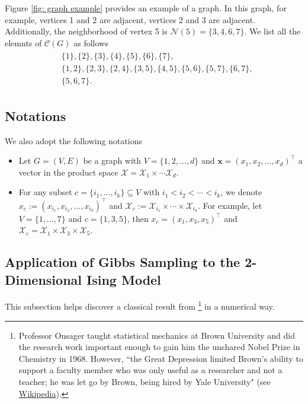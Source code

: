\documentclass[11pt,letterpaper, leqno]{article}
\numberwithin{equation}{section}
\numberwithin{theorem}{section}
\numberwithin{lemma}{section}
\numberwithin{corollary}{section}
\numberwithin{definition}{section}
\numberwithin{proposition}{section}
\numberwithin{remark}{section}
\numberwithin{example}{section}
\newcommand{\T}{\intercal}
\begin{document}
Figure \ref{fig: graph example} provides an example of a graph. In this graph, for example, vertices 1 and 2 are adjacent, vertices 2 and 3 are adjacent. Additionally, the neighborhood of vertex 5 is $\mathcal{N}(5)=\{3,4,6,7\}$. We list all the elemnts of $\mathcal{C}(G)$ as follows
\begin{align}\label{eq: cliques of the graph example}
    \begin{aligned}
    & \{1\}, \{2\}, \{3\}, \{4\}, \{5\}, \{6\}, \{7\}, \\
    & \{1,2\}, \{2,3\}, \{2,4\}, \{3,5\}, \{4,5\}, \{5,6\}, \{5,7\}, \{6,7\}, \\
    & \{5,6,7\}.
    \end{aligned}
\end{align}

\subsection{Notations}

We also adopt the following notations
\begin{itemize}
    \item Let $G=(V,E)$ be a graph with $V=\{1,2,\ldots,d\}$ and $\boldsymbol{x}=(x_1,x_2,\ldots,x_d)^\T$ a vector in the product space $\mathcal{X}=\mathcal{X}_1\times\cdots\mathcal{X}_d$.
    \item For any subset $c=\{i_1,\ldots,i_k\}\subseteq V$ with $i_1<i_2<\cdots<i_k$, we denote $x_c:=(x_{i_1}, x_{i_2}, \ldots, x_{i_k})^\T$ and $\mathcal{X}_c:=\mathcal{X}_{i_1}\times\cdots\times\mathcal{X}_{i_k}$. For example, let $V=\{1,\ldots,7\}$ and $c=\{1,3,5\}$, then $x_c=(x_1, x_3, x_5)^\T$ and $\mathcal{X}_c=\mathcal{X}_1\times\mathcal{X}_3\times\mathcal{X}_5$.
\end{itemize}

\subsection{Application of Gibbs Sampling to the 2-Dimensional Ising Model}

This subsection helps discover a classical result from \cite{onsager1944crystal}\footnote{Professor Onsager taught statistical mechanics at Brown University and did the research work important enough to gain him the unshared Nobel Prize in Chemistry in 1968. However, ``the Great Depression limited Brown's ability to support a faculty member who was only useful as a researcher and not a teacher; he was let go by Brown, being hired by Yale University" (see \href{https://en.wikipedia.org/wiki/Lars_Onsager}{Wikipedia}).} in a numerical way.
\end{document}

